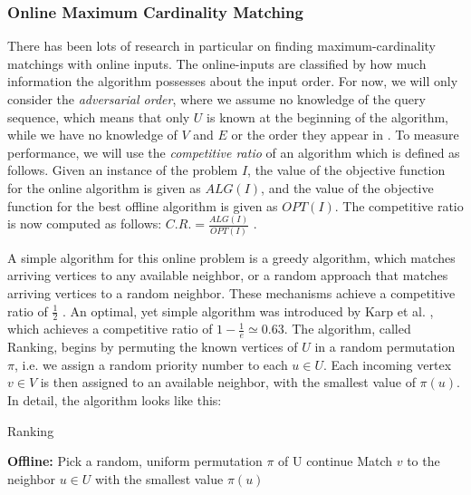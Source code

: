 \subsubsection{Online Maximum Cardinality Matching}
There has been lots of research in particular on finding maximum-cardinality matchings with online inputs. The online-inputs are classified by how much information the algorithm possesses about the input order. For now, we will only consider the \emph{adversarial order}, where we assume no knowledge of the query sequence, which means that only $U$ is known at the beginning of the algorithm, while we have no knowledge of $V$ and $E$ or the order they appear in \cite{Mehta:Online}. To measure performance, we will use the \emph{competitive ratio} of an algorithm which is defined as follows. Given an instance of the problem $I$, the value of the objective function for the online algorithm is given as $ALG(I)$, and the value of the objective function for the best offline algorithm is given as $OPT(I)$. The competitive ratio is now computed as follows: $C.R.=\frac{ALG(I)}{OPT(I)}$ \cite{Mehta:Online}.

A simple algorithm for this online problem is a greedy algorithm, which matches arriving vertices to any available neighbor, or a random approach that matches arriving vertices to a random neighbor. These mechanisms achieve a competitive ratio of $\frac{1}{2}$ \cite{Mehta:Online}. An optimal, yet simple algorithm was introduced by Karp et al. \cite{Karp:Online}, which achieves a competitive ratio of $1 - \frac{1}{e} \simeq 0.63$. The algorithm, called Ranking, begins by permuting the known vertices of $U$ in a random permutation $\pi$, i.e. we assign a random priority number to each $u \in U$. Each incoming vertex $v \in V$ is then assigned to an available neighbor, with the smallest value of $\pi(u)$. In detail, the algorithm looks like this:

\begin{algorithm} %
    \caption{Ranking} 
    \label{alg:ranking} %
    \begin{algorithmic} %
        \State \textbf{Offline:} Pick a random, uniform permutation $\pi$ of U
                \State continue
            \EndIf
            \State Match $v$ to the neighbor $u \in U$ with the smallest value $\pi(u)$
        \EndFor
    \end{algorithmic}
\end{algorithm}